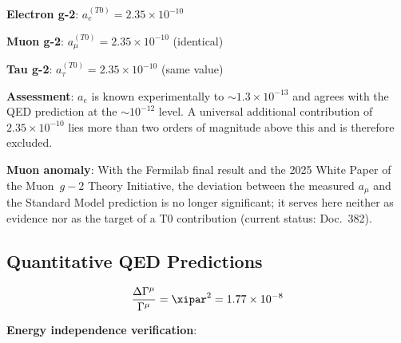 	\begin{tcolorbox}[colback=blue!5!white,colframe=blue!75!black,title=Universal Lepton Prediction]
		\textbf{Electron g-2}: $a_e^{(T0)} = 2.35 \times 10^{-10}$
		
		\textbf{Muon g-2}: $a_{\mu}^{(T0)} = 2.35 \times 10^{-10}$ (identical)
		
		\textbf{Tau g-2}: $a_{\tau}^{(T0)} = 2.35 \times 10^{-10}$ (same value)
		
		\textbf{Assessment}: $a_e$ is known experimentally to $\sim1.3\times10^{-13}$ and agrees with the QED prediction at the $\sim10^{-12}$ level. A universal additional contribution of $2.35\times10^{-10}$ lies more than two orders of magnitude above this and is therefore excluded.
		
		\textbf{Muon anomaly}: With the Fermilab final result and the 2025 White Paper of the Muon~$g-2$ Theory Initiative, the deviation between the measured $a_\mu$ and the Standard Model prediction is no longer significant; it serves here neither as evidence nor as the target of a T0 contribution (current status: Doc.~382).
	\end{tcolorbox}
	
	\subsection{Quantitative QED Predictions}
	
	\begin{equation}
		\frac{\Delta\Gamma^{\mu}}{\Gamma^{\mu}} = \xipar^2 = 1.77 \times 10^{-8}
		\label{eq:quantitative_qed_correction}
	\end{equation}
	
	\textbf{Energy independence verification}:
	\begin{table}[htbp]
		\centering
		\caption{Energy-independent T0 corrections vs. Standard Model}
	\end{table}
	
